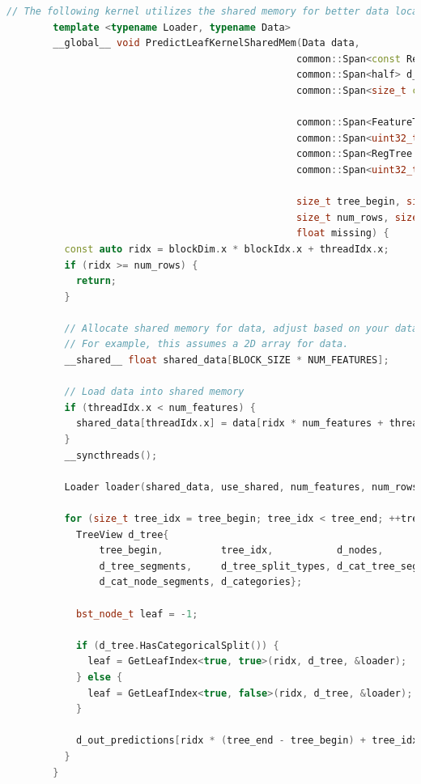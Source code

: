 \documentclass[14pt, a4paper]{extreport}
\begin{document}
    \begin{lstlisting}[language=C++, label={lst:xgboost_shared_memory_calculation}]
        // The following kernel utilizes the shared memory for better data locality.
        template <typename Loader, typename Data>
        __global__ void PredictLeafKernelSharedMem(Data data,
                                                  common::Span<const RegTree::Node> d_nodes,
                                                  common::Span<half> d_out_predictions,
                                                  common::Span<size_t const> d_tree_segments,

                                                  common::Span<FeatureType const> d_tree_split_types,
                                                  common::Span<uint32_t const> d_cat_tree_segments,
                                                  common::Span<RegTree::CategoricalSplitMatrix::Segment const> d_cat_node_segments,
                                                  common::Span<uint32_t const> d_categories,

                                                  size_t tree_begin, size_t tree_end, size_t num_features,
                                                  size_t num_rows, size_t entry_start, bool use_shared,
                                                  float missing) {
          const auto ridx = blockDim.x * blockIdx.x + threadIdx.x;
          if (ridx >= num_rows) {
            return;
          }

          // Allocate shared memory for data, adjust based on your data structure.
          // For example, this assumes a 2D array for data.
          __shared__ float shared_data[BLOCK_SIZE * NUM_FEATURES];

          // Load data into shared memory
          if (threadIdx.x < num_features) {
            shared_data[threadIdx.x] = data[ridx * num_features + threadIdx.x];
          }
          __syncthreads();

          Loader loader(shared_data, use_shared, num_features, num_rows, entry_start, missing);

          for (size_t tree_idx = tree_begin; tree_idx < tree_end; ++tree_idx) {
            TreeView d_tree{
                tree_begin,          tree_idx,           d_nodes,
                d_tree_segments,     d_tree_split_types, d_cat_tree_segments,
                d_cat_node_segments, d_categories};

            bst_node_t leaf = -1;

            if (d_tree.HasCategoricalSplit()) {
              leaf = GetLeafIndex<true, true>(ridx, d_tree, &loader);
            } else {
              leaf = GetLeafIndex<true, false>(ridx, d_tree, &loader);
            }

            d_out_predictions[ridx * (tree_end - tree_begin) + tree_idx] = __float2half_rn(leaf);
          }
        }
    \end{lstlisting}
\end{document}

